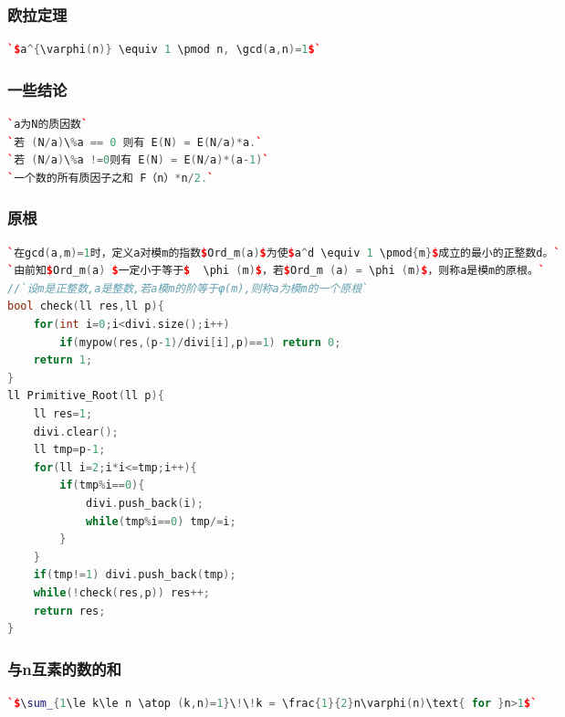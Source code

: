 \documentclass[a4paper]{article}
\begin{document}
\begin{CJK*}{UTF8}{gbsn}
\begin{multicols}{3}
\begin{flushleft}
\subsubsection{欧拉定理}
\begin{lstlisting}[language={c++}]
`$a^{\varphi(n)} \equiv 1 \pmod n, \gcd(a,n)=1$`
\end{lstlisting}

\subsubsection{一些结论}
\begin{lstlisting}[language={c++}]
`a为N的质因数`
`若 (N/a)\%a == 0 则有 E(N) = E(N/a)*a.`
`若 (N/a)\%a !=0则有 E(N) = E(N/a)*(a-1)`
`一个数的所有质因子之和 F（n）*n/2.`
\end{lstlisting}


\subsubsection{原根}
\begin{lstlisting}[language={c++}]
`在gcd(a,m)=1时，定义a对模m的指数$Ord_m(a)$为使$a^d \equiv 1 \pmod{m}$成立的最小的正整数d。`
`由前知$Ord_m(a) $一定小于等于$  \phi (m)$，若$Ord_m (a) = \phi (m)$，则称a是模m的原根。`
//`设m是正整数,a是整数,若a模m的阶等于φ(m),则称a为模m的一个原根`
bool check(ll res,ll p){
    for(int i=0;i<divi.size();i++)
        if(mypow(res,(p-1)/divi[i],p)==1) return 0;
    return 1;
}
ll Primitive_Root(ll p){
    ll res=1;
    divi.clear();
    ll tmp=p-1;
    for(ll i=2;i*i<=tmp;i++){
        if(tmp%i==0){
            divi.push_back(i);
            while(tmp%i==0) tmp/=i;
        }
    }
    if(tmp!=1) divi.push_back(tmp);
    while(!check(res,p)) res++;
    return res;
}
\end{lstlisting}


\subsubsection{与n互素的数的和}
\begin{lstlisting}[language={c++}]
`$\sum_{1\le k\le n \atop (k,n)=1}\!\!k = \frac{1}{2}n\varphi(n)\text{ for }n>1$`
\end{lstlisting}



\end{flushleft}
\end{multicols}
\end{CJK*}
\end{document}
